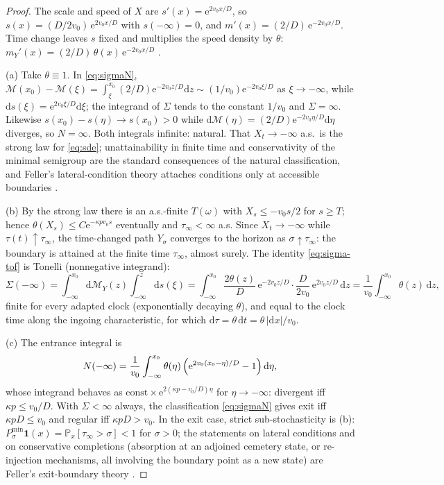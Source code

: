 \documentclass[11pt]{article}
\theoremstyle{definition}
\theoremstyle{remark}
\newcommand{\ee}{\mathrm{e}}
\newcommand{\dd}{\mathrm{d}}
\begin{document}
\begin{proof}
The scale and speed of $X$ are
$s'(x)=\ee^{2v_{0}x/D}$, so $s(x)=(D/2v_{0})\,\ee^{2v_{0}x/D}$ with
$s(-\infty)=0$, and $m'(x)=(2/D)\,\ee^{-2v_{0}x/D}$. Time change
leaves $s$ fixed and multiplies the speed density by $\theta$:
$m_{Y}'(x)=(2/D)\,\theta(x)\,\ee^{-2v_{0}x/D}$
\cite{ItoMcKean,KarlinTaylor}.

(a) Take $\theta\equiv1$. In \eqref{eq:sigmaN},
$\mathcal{M}(x_{0})-\mathcal{M}(\xi)=\int_{\xi}^{x_{0}}(2/D)\ee^{-2v_{0}z/D}\dd z
\sim(1/v_{0})\ee^{-2v_{0}\xi/D}$ as $\xi\to-\infty$, while
$\dd s(\xi)=\ee^{2v_{0}\xi/D}\dd\xi$; the integrand of $\Sigma$ tends
to the constant $1/v_{0}$ and $\Sigma=\infty$. Likewise
$s(x_{0})-s(\eta)\to s(x_{0})>0$ while
$\dd \mathcal{M}(\eta)=(2/D)\ee^{-2v_{0}\eta/D}\dd\eta$ diverges, so
$N=\infty$. Both integrals infinite: natural. That $X_{t}\to-\infty$
a.s.\ is the strong law for \eqref{eq:sde}; unattainability in finite
time and conservativity of the minimal semigroup are the standard
consequences of the natural classification, and Feller's
lateral-condition theory attaches conditions only at accessible
boundaries \cite{Feller1952,ItoMcKean}.

(b) By the strong law there is an a.s.-finite $T(\omega)$ with
$X_{s}\le -v_{0}s/2$ for $s\ge T$; hence
$\theta(X_{s})\le C\ee^{-\kappa p v_{0}s}$ eventually and
$\tau_{\infty}<\infty$ a.s. Since $X_{t}\to-\infty$ while
$\tau(t)\uparrow\tau_{\infty}$, the time-changed path
$Y_{\sigma}$ converges to the horizon as
$\sigma\uparrow\tau_{\infty}$: the boundary is attained at the finite
time $\tau_{\infty}$, almost surely. The identity
\eqref{eq:sigma-tof} is Tonelli (nonnegative integrand):
\begin{equation*}
\Sigma(-\infty)
=\int_{-\infty}^{x_{0}}\!\!\dd \mathcal{M}_{Y}(z)\int_{-\infty}^{z}\!\dd s(\xi)
=\int_{-\infty}^{x_{0}}\frac{2\theta(z)}{D}\,\ee^{-2v_{0}z/D}\cdot
\frac{D}{2v_{0}}\,\ee^{2v_{0}z/D}\,\dd z
=\frac{1}{v_{0}}\int_{-\infty}^{x_{0}}\theta(z)\,\dd z ,
\end{equation*}
finite for every adapted clock (exponentially decaying $\theta$), and
equal to the clock time along the ingoing characteristic, for which
$\dd\tau=\theta\,\dd t=\theta\,|\dd x|/v_{0}$.

(c) The entrance integral is
\begin{equation}
N(-\infty)
=\frac{1}{v_{0}}\int_{-\infty}^{x_{0}}
\theta(\eta)\,\Bigl(\ee^{2v_{0}(x_{0}-\eta)/D}-1\Bigr)\,\dd\eta ,
\label{eq:Nintegral}
\end{equation}
whose integrand behaves as
$\mathrm{const}\times\ee^{2(\kappa p-v_{0}/D)\eta}$ for
$\eta\to-\infty$: divergent iff $\kappa p\le v_{0}/D$. With
$\Sigma<\infty$ always, the classification
\eqref{eq:sigmaN} gives exit iff $\kappa pD\le v_{0}$ and regular iff
$\kappa pD>v_{0}$. In the exit case, strict sub-stochasticity is (b):
$P^{\min}_{\sigma}\mathbf{1}(x)
=\mathbb{P}_{x}[\tau_{\infty}>\sigma]<1$ for $\sigma>0$; the
statements on lateral conditions and on conservative completions
(absorption at an adjoined cemetery state, or re-injection
mechanisms, all involving the boundary point as a new state) are
Feller's exit-boundary theory \cite{Feller1952,ItoMcKean}.
\end{proof}
\end{document}
